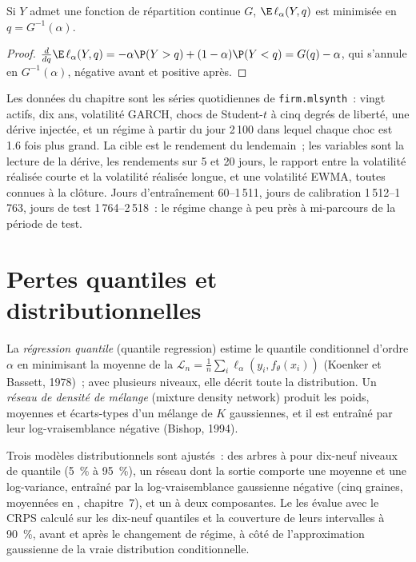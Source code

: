 \begin{proposition}\label{prop:ml:uncert:pinball}
Si $Y$ admet une fonction de répartition continue $G$, $\E\,\ell_\alpha(Y, q)$ est minimisée en $q = G^{-1}(\alpha)$.
\end{proposition}

\begin{proof}
$\frac{d}{dq}\E\,\ell_\alpha(Y, q) = -\alpha\P(Y > q) + (1 - \alpha)\P(Y < q) = G(q) - \alpha$, qui s'annule en
$G^{-1}(\alpha)$, négative avant et positive après.
\end{proof}

Les données du chapitre sont les séries quotidiennes de \texttt{firm.mlsynth}~: vingt actifs, dix ans, volatilité GARCH, chocs de Student-$t$
à cinq degrés de liberté, une dérive injectée, et un régime à partir du jour 2\,100 dans lequel chaque choc est 1.6 fois
plus grand. La cible est le rendement du lendemain~; les variables sont la lecture de la dérive, les rendements sur 5 et 20 jours, le rapport
entre la volatilité réalisée courte et la volatilité réalisée longue, et une volatilité EWMA, toutes connues à la clôture. Jours d'entraînement 60--1\,511, jours
de calibration 1\,512--1\,763, jours de test 1\,764--2\,518~: le régime change à peu près à mi-parcours de la période de test.

\section{Pertes quantiles et distributionnelles}

\begin{definition}\label{def:ml:probabilistic-models-and-uncertainty:quantile}
La \emph{régression quantile} (quantile regression) estime le quantile conditionnel d'ordre $\alpha$ en minimisant la moyenne
de la  $\mathcal L_n = \frac1n\sum_i\ell_\alpha(y_i, f_\theta(x_i))$ (Koenker et Bassett, 1978)~; avec plusieurs
niveaux, elle décrit toute la distribution. Un \emph{réseau de densité de mélange} (mixture density network) produit les
poids, moyennes et écarts-types d'un mélange de $K$ gaussiennes, et il est entraîné par leur log-vraisemblance négative
(Bishop, 1994).
\end{definition}

Trois modèles distributionnels sont ajustés~: des arbres à  pour dix-neuf niveaux de quantile (5~\% à 95~\%), un réseau
dont la sortie comporte une moyenne et une log-variance, entraîné par la log-vraisemblance gaussienne négative (cinq graines, moyennées en ,
chapitre~7), et un  à deux composantes. Le  les évalue avec le CRPS calculé sur les
dix-neuf quantiles et la couverture de leurs intervalles à 90~\%, avant et après le changement de régime, à côté de
l'approximation gaussienne de la vraie distribution conditionnelle.

